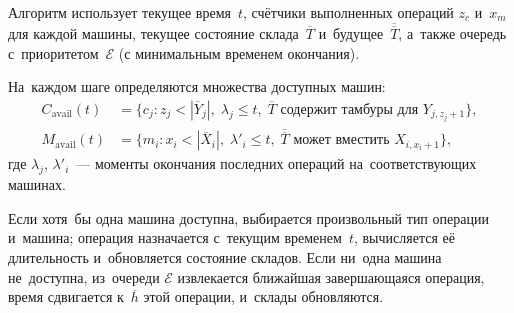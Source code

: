 Алгоритм использует текущее время~$t$, счётчики выполненных операций $z_c$ и~$x_m$ для каждой машины, текущее состояние склада~$\overline{T}$ и~будущее~$\overline{\overline{T}}$, а~также очередь с~приоритетом~$\mathcal{E}$ (с минимальным временем окончания).

На~каждом шаге определяются множества доступных машин:
\begin{align*}
  C_{\mathrm{avail}}(t) &= \bigl\{c_j : z_j < |\overline{Y}_j|,\;\lambda_j \le t,\;\overline{T}\text{ содержит тамбуры для }Y_{j,z_j+1}\bigr\},\\
  M_{\mathrm{avail}}(t) &= \bigl\{m_i : x_i < |\overline{X}_i|,\;\lambda'_i \le t,\;\overline{\overline{T}}\text{ может вместить }X_{i,x_i+1}\bigr\},
\end{align*}
где $\lambda_j$, $\lambda'_i$~--- моменты окончания последних операций на~соответствующих машинах.

Если хотя~бы одна машина доступна, выбирается произвольный тип операции и~машина; операция назначается с~текущим временем~$t$, вычисляется её длительность и~обновляется состояние складов.
Если ни~одна машина не~доступна, из~очереди $\mathcal{E}$ извлекается ближайшая завершающаяся операция, время сдвигается к~$\overline{h}$ этой операции, и~склады обновляются.

\begin{center}
\label{alg:generate_event_queue}
\end{center}


